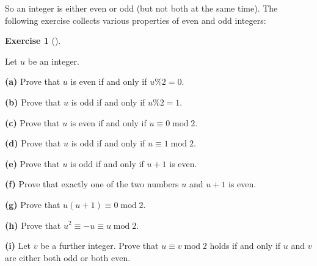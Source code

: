 \documentclass[numbers=enddot,12pt,final,onecolumn,notitlepage]{scrartcl}%
\newcounter{exer}
\numberwithin{exer}{subsection}
\theoremstyle{definition}
\newtheorem{exmp}[exer]{Exercise}
\newenvironment{exercise}[1][]
{\begin{exmp}[#1]\begin{leftbar}}
{\end{leftbar}\end{exmp}}
\begin{document}
So an integer is either even or odd (but not both at the same time). The
following exercise collects various properties of even and odd integers:

\begin{exercise}
\label{exe.ent.even-odd.1}Let $u$ be an integer.

\textbf{(a)} Prove that $u$ is even if and only if $u\%2=0$.

\textbf{(b)} Prove that $u$ is odd if and only if $u\%2=1$.

\textbf{(c)} Prove that $u$ is even if and only if $u\equiv0\operatorname{mod}%
2$.

\textbf{(d)} Prove that $u$ is odd if and only if $u\equiv1\operatorname{mod}%
2$.

\textbf{(e)} Prove that $u$ is odd if and only if $u+1$ is even.

\textbf{(f)} Prove that exactly one of the two numbers $u$ and $u+1$ is even.

\textbf{(g)} Prove that $u\left(  u+1\right)  \equiv0\operatorname{mod}2$.

\textbf{(h)} Prove that $u^{2}\equiv-u\equiv u\operatorname{mod}2$.

\textbf{(i)} Let $v$ be a further integer. Prove that $u\equiv
v\operatorname{mod}2$ holds if and only if $u$ and $v$ are either both odd or
both even.
\end{exercise}
\end{document}
